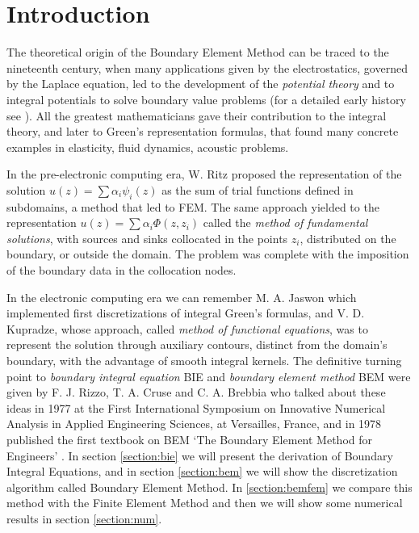 \documentclass[10pt, a4paper]{article} %
\numberwithin{equation}{section}
\theoremstyle{definition}
\theoremstyle{plain}
\theoremstyle{plain}
\theoremstyle{plain}
\theoremstyle{plain}
\theoremstyle{plain}
\theoremstyle{plain}
\theoremstyle{plain}
\theoremstyle{plain}
\begin{document}
\section{Introduction}
The theoretical origin of the Boundary Element Method can be traced to the nineteenth century,
when many applications given by the electrostatics, governed by the Laplace equation, 
led to the development of the \emph{potential theory} 
and to integral potentials to solve boundary value problems
(for a detailed early history see \cite{cheng-cheng:history}).
All the greatest mathematicians gave their contribution to the integral theory, 
and later to Green's representation formulas, that found many concrete examples in 
elasticity, fluid  dynamics, acoustic problems.
\par
In the pre-electronic computing era, W. Ritz proposed the representation of the solution
$u(z)=\sum\alpha_i\psi_i(z)$ as the sum of trial functions defined in subdomains, a method 
that led to FEM. The same approach yielded to the representation 
$u(z)=\sum\alpha_i\Phi(z,z_i)$ called the \emph{method of fundamental solutions}, with sources
and sinks collocated in the points $z_i$, distributed on the boundary, or outside the domain.
The problem was complete with the imposition of the boundary data in the collocation
nodes.
\par
In the electronic computing era we can remember M. A. Jaswon which implemented first discretizations 
of integral Green's formulas, and V. D. Kupradze, whose approach, called \emph{method of 
functional equations}, was to represent the solution through auxiliary contours, distinct 
from the domain's boundary, with the advantage of smooth integral kernels.
The definitive turning point to \emph{boundary integral equation} BIE and 
\emph{boundary element method} BEM were given by F. J. Rizzo, T. A. Cruse and 
C. A. Brebbia who talked about these ideas in 1977 at the First International
Symposium on Innovative Numerical Analysis in Applied
Engineering Sciences, at Versailles, France, 
and in 1978 published the first textbook on BEM
‘The Boundary Element Method for Engineers' \cite{brebbia:book}.
In section \ref{section:bie} we will present the derivation of Boundary Integral Equations, 
and in section \ref{section:bem} we will show the discretization algorithm called Boundary
Element Method. In \ref{section:bemfem} we compare this method with the Finite Element Method
and then we will show some numerical results in section \ref{section:num}.
\end{document}
